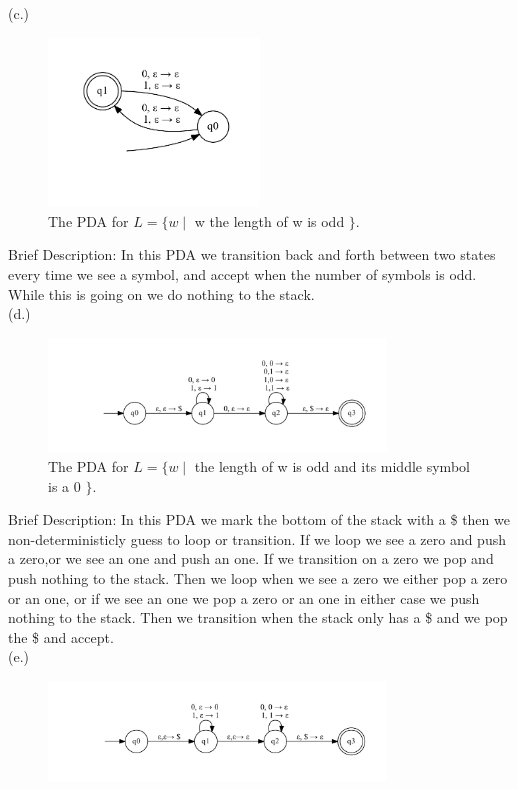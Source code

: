 \documentclass[10pt] {article}
\begin{document}
\begin{enumerate}
(c.) 
\begin{figure}[H]
\includegraphics[width=0.5\textwidth]{c25.pdf}
\caption{The PDA for $L=\{w \mid$ w the length of w is odd $\}$.}
\label{3}
\end{figure}
Brief Description: In this PDA we transition back and forth between two states every time we see a symbol, and accept when the number of symbols is odd. While this is going on we do nothing to the stack.\\
(d.)
\begin{figure}[H]
\includegraphics[width=0.8\textwidth]{d25.pdf}
\caption{The PDA for $L=\{w \mid$ the length of w is odd and its middle symbol is a 0 $\}.$}
\label{4}
\end{figure}
Brief Description: In this PDA we mark the bottom of the stack with a \$ then we non-deterministicly guess to loop or transition. If we loop we see a zero and push a zero,or we see an one and push an one. If we transition on a zero we pop and push nothing to the stack. Then we loop when we see a zero we either pop a zero or an one, or if we see an one we pop a zero or an one in either case we push nothing to the stack. Then we transition when the stack only has a \$ and we pop the \$ and accept.  \\
(e.)
\begin{figure}[H]
\includegraphics[width=0.8\textwidth]{e25.pdf}

\end{figure}
\end{enumerate}
\end{document}
